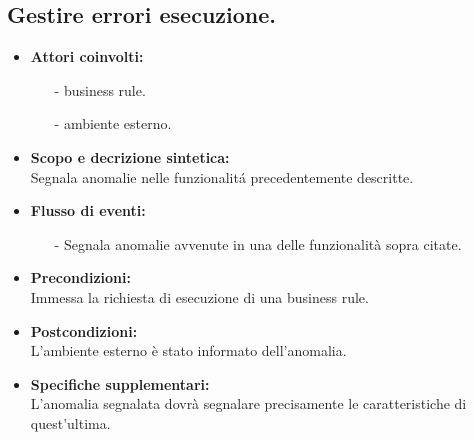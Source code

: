 \documentclass[11pt,titlepage,a4paper]{report}
\begin{document}
\subsection{Gestire errori esecuzione.}
\begin{itemize}
\item{\textbf{Attori coinvolti:}}
\begin{itemize}
 \item[-] business rule.
 \item[-] ambiente esterno.
\end{itemize}
\item{\textbf{Scopo e decrizione sintetica:}}\\
Segnala anomalie nelle funzionalit\'a precedentemente descritte.
\item{\textbf{Flusso di eventi:}}
\begin{itemize}
 \item[-] {Segnala anomalie avvenute in una delle funzionalit\`a sopra citate.}
\end{itemize}
\item{\textbf{Precondizioni:}}\\
Immessa la richiesta di esecuzione di una business rule.
\item{\textbf{Postcondizioni:}}\\
L'ambiente esterno \`e stato informato dell'anomalia.
\item\textbf{{Specifiche supplementari:}}\\
L'anomalia segnalata dovr\`a segnalare precisamente le caratteristiche di quest'ultima.
\end{itemize}
\end{document}
